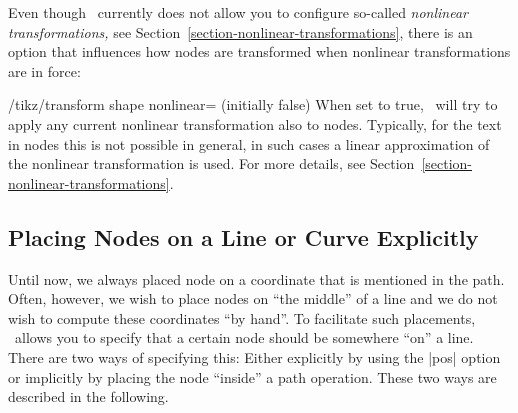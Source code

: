 Even though \tikzname\ currently does not allow you to configure so-called
\emph{nonlinear transformations,} see
Section~\ref{section-nonlinear-transformations}, there is an option that
influences how nodes are transformed when nonlinear transformations are in
force:
%
\begin{key}{/tikz/transform shape nonlinear=  (initially false)}
    When set to true, \tikzname\ will try to apply any current nonlinear
    transformation also to nodes. Typically, for the text in nodes this is not
    possible in general, in such cases a linear approximation of the nonlinear
    transformation is used. For more details, see
    Section~\ref{section-nonlinear-transformations}.
\makeatletter
\begin{codeexample}[
    preamble={\usepgfmodule{nonlineartransformations}\usetikzlibrary{curvilinear}},
    pre={\makeatletter},
]
\end{codeexample}
\end{key}


\subsection{Placing Nodes on a Line or Curve Explicitly}
\label{section-nodes-placing-1}

Until now, we always placed node on a coordinate that is mentioned in the path.
Often, however, we wish to place nodes on ``the middle'' of a line and we do
not wish to compute these coordinates ``by hand''. To facilitate such
placements, \tikzname\ allows you to specify that a certain node should be
somewhere ``on'' a line. There are two ways of specifying this: Either
explicitly by using the |pos| option or implicitly by placing the node
``inside'' a path operation. These two ways are described in the following.


